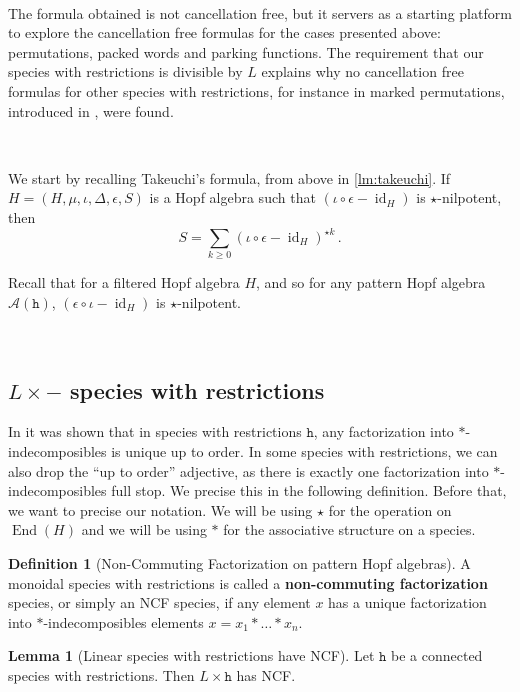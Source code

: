 \documentclass[12pt, reqno]{amsart}
\theoremstyle{definition}
\newtheorem{lm}[thm]{Lemma}
\newtheorem{defin}[thm]{Definition}
\DeclareMathOperator{\id}{id}
\DeclareMathOperator{\End}{\mathrm{End}}
\begin{document}
\

The formula obtained is not cancellation free, but it servers as a starting platform to explore the cancellation free formulas for the cases presented above: permutations, packed words and parking functions. The requirement that our species with restrictions is divisible by $L$ explains why no cancellation free formulas for other species with restrictions, for instance in marked permutations, introduced in \cite{Penaguiao2020}, were found.

\

We start by recalling Takeuchi's formula, from above in \cref{lm:takeuchi}.
If $H = (H, \mu, \iota, \Delta, \epsilon, S)$ is a Hopf algebra such that $(  \iota  \circ\epsilon - \id_H)$ is $\star$-nilpotent, then 
$$S = \sum_{k\geq 0 }  ( \iota  \circ\epsilon- \id_H)^{\star k}\, . $$

Recall that for a filtered Hopf algebra $H$, and so for any pattern Hopf algebra $\mathcal A (\mathtt{h})$, $(\epsilon\circ \iota - \id_H)$ is $\star$-nilpotent. 

\

\subsection{$L\times -$ species with restrictions}


In \cite[Corollary 3.4.]{Penaguiao2020} it was shown that in species with restrictions $\mathtt{h}$, any factorization into $\ast$-indecomposibles is unique up to order.
In some species with restrictions, we can also drop the ``up to order'' adjective, as there is exactly one factorization into $\ast$-indecomposibles full stop. We precise this in the following definition.
Before that, we want to precise our notation.
We will be using $\star$ for the operation on $\End (H)$ and we will be using $\ast $ for the associative structure on a species.



\begin{defin}[Non-Commuting Factorization on pattern Hopf algebras]\label{defin:ncf}
A monoidal species with restrictions is called a \textbf{non-commuting factorization} species, or simply an NCF species, if any element $x$ has a unique factorization into $\ast$-indecomposibles elements $x = x_1 \ast \dots \ast x_n$.
\end{defin}


\begin{lm}[Linear species with restrictions have NCF]
Let $\mathtt{h}$ be a connected species with restrictions.
Then $L \times \mathtt{h}$ has NCF.
\end{lm}
\end{document}
